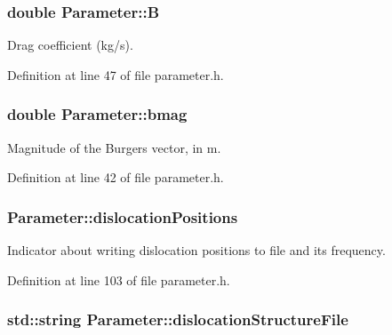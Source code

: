 \hypertarget{classParameter_a5b9ced72f8fa0ff3100140e00174d351}{
\subsubsection[{\-B}]{\setlength{\rightskip}{0pt plus 5cm}double {\bf \-Parameter\-::\-B}}}\label{dc/dab/classParameter_a5b9ced72f8fa0ff3100140e00174d351}


\-Drag coefficient (kg/s). 



\-Definition at line 47 of file parameter.\-h.

\hypertarget{classParameter_a32658eea8eb0afef898daada83017143}{
\subsubsection[{bmag}]{\setlength{\rightskip}{0pt plus 5cm}double {\bf \-Parameter\-::bmag}}}\label{dc/dab/classParameter_a32658eea8eb0afef898daada83017143}


\-Magnitude of the \-Burgers vector, in m. 



\-Definition at line 42 of file parameter.\-h.

\hypertarget{classParameter_a5ed36460146364585c875d030289a4cc}{
\subsubsection[{dislocation\-Positions}]{ {\bf \-Parameter\-::dislocation\-Positions}}}\label{dc/dab/classParameter_a5ed36460146364585c875d030289a4cc}


\-Indicator about writing dislocation positions to file and its frequency. 



\-Definition at line 103 of file parameter.\-h.

\hypertarget{classParameter_a6beb94fd77a5a3f73b87eeb942f2964a}{
\subsubsection[{dislocation\-Structure\-File}]{\setlength{\rightskip}{0pt plus 5cm}std\-::string {\bf \-Parameter\-::dislocation\-Structure\-File}}}\label{dc/dab/classParameter_a6beb94fd77a5a3f73b87eeb942f2964a}


